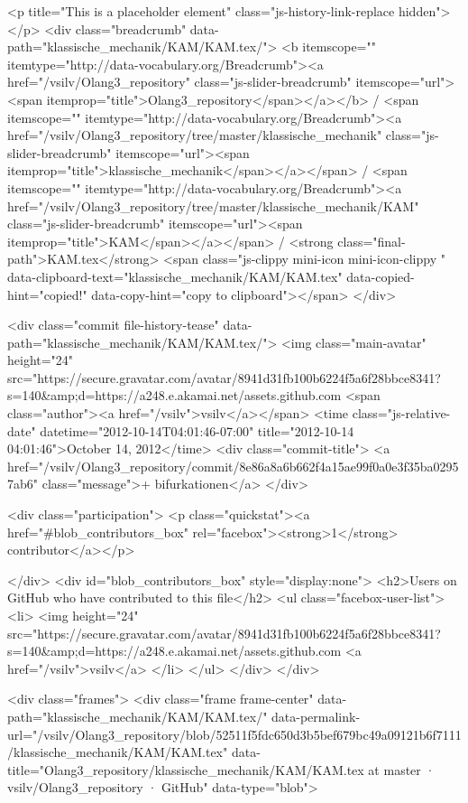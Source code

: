     <p title="This is a placeholder element" class="js-history-link-replace hidden"></p>
    <div class="breadcrumb" data-path="klassische_mechanik/KAM/KAM.tex/">
      <b itemscope="" itemtype="http://data-vocabulary.org/Breadcrumb"><a href="/vsilv/Olang3_repository" class="js-slider-breadcrumb" itemscope="url"><span itemprop="title">Olang3_repository</span></a></b> / <span itemscope="" itemtype="http://data-vocabulary.org/Breadcrumb"><a href="/vsilv/Olang3_repository/tree/master/klassische_mechanik" class="js-slider-breadcrumb" itemscope="url"><span itemprop="title">klassische_mechanik</span></a></span> / <span itemscope="" itemtype="http://data-vocabulary.org/Breadcrumb"><a href="/vsilv/Olang3_repository/tree/master/klassische_mechanik/KAM" class="js-slider-breadcrumb" itemscope="url"><span itemprop="title">KAM</span></a></span> / <strong class="final-path">KAM.tex</strong> <span class="js-clippy mini-icon mini-icon-clippy " data-clipboard-text="klassische_mechanik/KAM/KAM.tex" data-copied-hint="copied!" data-copy-hint="copy to clipboard"></span>
    </div>

      
  <div class="commit file-history-tease" data-path="klassische_mechanik/KAM/KAM.tex/">
    <img class="main-avatar" height="24" src="https://secure.gravatar.com/avatar/8941d31fb100b6224f5a6f28bbce8341?s=140&amp;d=https://a248.e.akamai.net/assets.github.com%
    <span class="author"><a href="/vsilv">vsilv</a></span>
    <time class="js-relative-date" datetime="2012-10-14T04:01:46-07:00" title="2012-10-14 04:01:46">October 14, 2012</time>
    <div class="commit-title">
        <a href="/vsilv/Olang3_repository/commit/8e86a8a6b662f4a15ae99f0a0e3f35ba02957ab6" class="message">+ bifurkationen</a>
    </div>

    <div class="participation">
      <p class="quickstat"><a href="#blob_contributors_box" rel="facebox"><strong>1</strong> contributor</a></p>
      
    </div>
    <div id="blob_contributors_box" style="display:none">
      <h2>Users on GitHub who have contributed to this file</h2>
      <ul class="facebox-user-list">
        <li>
          <img height="24" src="https://secure.gravatar.com/avatar/8941d31fb100b6224f5a6f28bbce8341?s=140&amp;d=https://a248.e.akamai.net/assets.github.com%
          <a href="/vsilv">vsilv</a>
        </li>
      </ul>
    </div>
  </div>


    <div class="frames">
      <div class="frame frame-center" data-path="klassische_mechanik/KAM/KAM.tex/" data-permalink-url="/vsilv/Olang3_repository/blob/52511f5fdc650d3b5bef679bc49a09121b6f7111/klassische_mechanik/KAM/KAM.tex" data-title="Olang3_repository/klassische_mechanik/KAM/KAM.tex at master · vsilv/Olang3_repository · GitHub" data-type="blob">


